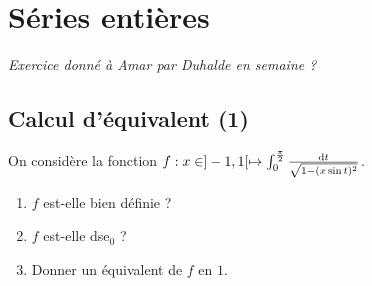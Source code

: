 \begin{sol}
	[À rédiger]
\end{sol}

%
%

\newpage
\section[Séries entières]{Séries entières}
\textit{Exercice donné à Amar par Duhalde en semaine ?}
\subsection{Calcul d'équivalent (1)}
\begin{exo}
	On considère la fonction $f:x\in]-1,1[\mapsto \int_0^{\frac\pi2}\frac{\operatorname*{d\!} t}{\sqrt{1-(x\sin t)^2}}$.
	\begin{enumerate}
		\item $f$ est-elle bien définie ?
		\item $f$ est-elle dse${}_0$ ?
		\item Donner un équivalent de $f$ en $1$.
	\end{enumerate}
\end{exo}


